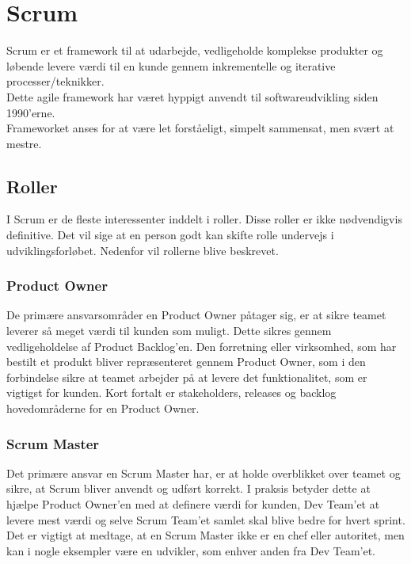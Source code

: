 \section{Scrum}\label{sec:scrum}
Scrum er et framework til at udarbejde, vedligeholde komplekse produkter og løbende levere 
værdi til en kunde gennem inkrementelle og iterative processer/teknikker. \\

Dette agile framework har været hyppigt anvendt til softwareudvikling siden 1990’erne. \\

Frameworket anses for at være let forståeligt, simpelt sammensat, men svært at mestre.

\subsection{Roller}
I Scrum er de fleste interessenter inddelt i roller. Disse roller er ikke nødvendigvis definitive. Det vil sige at
en person godt kan skifte rolle undervejs i udviklingsforløbet. Nedenfor vil rollerne blive beskrevet.

\subsubsection{Product Owner}
De primære ansvarsområder en Product Owner påtager sig, er at sikre teamet leverer så 
meget værdi til kunden som muligt. Dette sikres gennem vedligeholdelse af Product Backlog’en. 
Den forretning eller virksomhed, som har bestilt et produkt bliver repræsenteret gennem 
Product Owner, som i den forbindelse sikre at teamet arbejder på at levere det funktionalitet, 
som er vigtigst for kunden. Kort fortalt er stakeholders, releases og backlog hovedområderne for en Product Owner.

\subsubsection{Scrum Master}    
Det primære ansvar en Scrum Master har, er at holde overblikket over teamet og sikre, at Scrum bliver anvendt 
og udført korrekt. I praksis betyder dette at hjælpe Product Owner’en med at definere værdi for kunden, 
Dev Team’et at levere mest værdi og selve Scrum Team’et samlet skal blive bedre for hvert sprint. 
Det er vigtigt at medtage, at en Scrum Master ikke er en chef eller autoritet, men kan i nogle eksempler 
være en udvikler, som enhver anden fra Dev Team’et.

